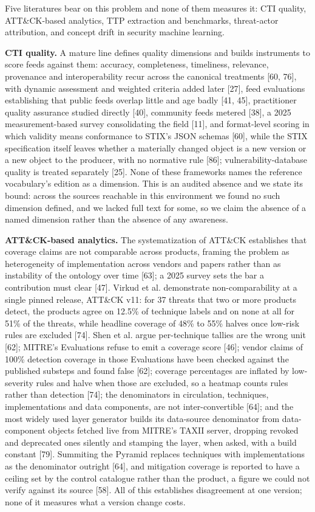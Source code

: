 \documentclass[11pt,a4paper]{article}
\begin{document}
Five literatures bear on this problem and none of them measures it: CTI quality, ATT\&CK-based analytics, TTP extraction and benchmarks, threat-actor attribution, and concept drift in security machine learning.

\textbf{CTI quality.} A mature line defines quality dimensions and builds instruments to score feeds against them: accuracy, completeness, timeliness, relevance, provenance and interoperability recur across the canonical treatments [60, 76], with dynamic assessment and weighted criteria added later [27], feed evaluations establishing that public feeds overlap little and age badly [41, 45], practitioner quality assurance studied directly [40], community feeds metered [38], a 2025 measurement-based survey consolidating the field [11], and format-level scoring in which validity means conformance to STIX's JSON schemas [60], while the STIX specification itself leaves whether a materially changed object is a new version or a new object to the producer, with no normative rule [86]; vulnerability-database quality is treated separately [25]. None of these frameworks names the reference vocabulary's edition as a dimension. This is an audited absence and we state its bound: across the sources reachable in this environment we found no such dimension defined, and we lacked full text for some, so we claim the absence of a named dimension rather than the absence of any awareness.

\textbf{ATT\&CK-based analytics.} The systematization of ATT\&CK establishes that coverage claims are not comparable across products, framing the problem as heterogeneity of implementation across vendors and papers rather than as instability of the ontology over time [63]; a 2025 survey sets the bar a contribution must clear [47]. Virkud et al. demonstrate non-comparability at a single pinned release, ATT\&CK v11: for 37 threats that two or more products detect, the products agree on 12.5\% of technique labels and on none at all for 51\% of the threats, while headline coverage of 48\% to 55\% halves once low-risk rules are excluded [74]. Shen et al. argue per-technique tallies are the wrong unit [62]; MITRE's Evaluations refuse to emit a coverage score [46]; vendor claims of 100\% detection coverage in those Evaluations have been checked against the published substeps and found false [62]; coverage percentages are inflated by low-severity rules and halve when those are excluded, so a heatmap counts rules rather than detection [74]; the denominators in circulation, techniques, implementations and data components, are not inter-convertible [64]; and the most widely used layer generator builds its data-source denominator from data-component objects fetched live from MITRE's TAXII server, dropping revoked and deprecated ones silently and stamping the layer, when asked, with a build constant [79]. Summiting the Pyramid replaces techniques with implementations as the denominator outright [64], and mitigation coverage is reported to have a ceiling set by the control catalogue rather than the product, a figure we could not verify against its source [58]. All of this establishes disagreement at one version; none of it measures what a version change costs.
\end{document}
